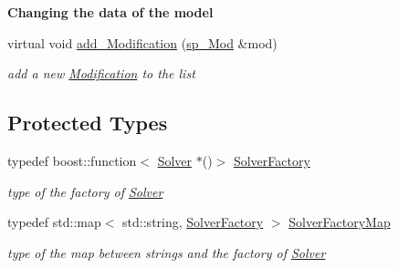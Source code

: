 \begin{Indent}\textbf{ Changing the data of the model}\par
\begin{DoxyCompactItemize}
\item 
virtual void \mbox{\hyperlink{class_s_m_spp__di__unipi__it_1_1_solver_ae71b15277f34912175559c36e04f98fd}{add\+\_\+\+Modification}} (\mbox{\hyperlink{group___modification___t_y_p_e_s_ga9024cf2ead61a1280d29771b063b1a62}{sp\+\_\+\+Mod}} \&mod)
\begin{DoxyCompactList}\small\item\em add a new \mbox{\hyperlink{class_s_m_spp__di__unipi__it_1_1_modification}{Modification}} to the list \end{DoxyCompactList}\end{DoxyCompactItemize}
\end{Indent}
\subsection*{Protected Types}
\begin{DoxyCompactItemize}
\item 
\mbox{\label{class_s_m_spp__di__unipi__it_1_1_solver_a3e427f2d8c0cf746682b2b00318b61dc}} 
typedef boost\+::function$<$ \mbox{\hyperlink{class_s_m_spp__di__unipi__it_1_1_solver}{Solver}} $\ast$()$>$ \mbox{\hyperlink{class_s_m_spp__di__unipi__it_1_1_solver_a3e427f2d8c0cf746682b2b00318b61dc}{Solver\+Factory}}
\begin{DoxyCompactList}\small\item\em type of the factory of \mbox{\hyperlink{class_s_m_spp__di__unipi__it_1_1_solver}{Solver}} \end{DoxyCompactList}\item 
\mbox{\label{class_s_m_spp__di__unipi__it_1_1_solver_a648aad605b7d80ef4469835bb60fc6c4}} 
typedef std\+::map$<$ std\+::string, \mbox{\hyperlink{class_s_m_spp__di__unipi__it_1_1_solver_a3e427f2d8c0cf746682b2b00318b61dc}{Solver\+Factory}} $>$ \mbox{\hyperlink{class_s_m_spp__di__unipi__it_1_1_solver_a648aad605b7d80ef4469835bb60fc6c4}{Solver\+Factory\+Map}}
\begin{DoxyCompactList}\small\item\em type of the map between strings and the factory of \mbox{\hyperlink{class_s_m_spp__di__unipi__it_1_1_solver}{Solver}} \end{DoxyCompactList}\end{DoxyCompactItemize}
